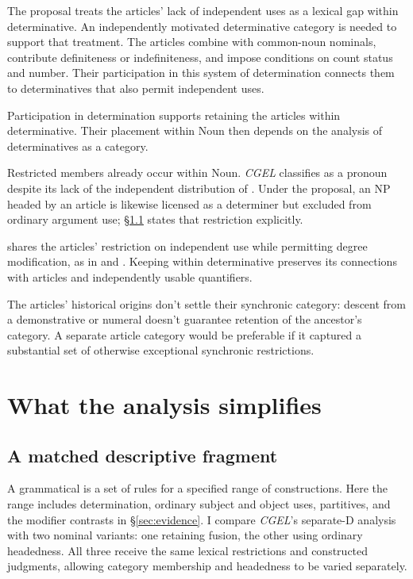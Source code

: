 \documentclass[12pt]{article}
\begin{document}
The proposal treats the articles' lack of independent uses as a lexical gap within determinative. An independently motivated determinative category is needed to support that treatment. The articles combine with common-noun nominals, contribute definiteness or indefiniteness, and impose conditions on count status and number. Their participation in this system of determination connects them to determinatives that also permit independent uses.

Participation in determination supports retaining the articles within determinative. Their placement within Noun then depends on the analysis of determinatives as a category.

Restricted members already occur within Noun. \textit{CGEL} classifies  as a pronoun despite its lack of the independent distribution of  \citep[470--471]{huddleston2002}. Under the proposal, an NP headed by an article is likewise licensed as a determiner but excluded from ordinary argument use; §\ref{sec:fragment} states that restriction explicitly.

 shares the articles' restriction on independent use while permitting degree modification, as in  and . Keeping  within determinative preserves its connections with articles and independently usable quantifiers.

The articles' historical origins don't settle their synchronic category: descent from a demonstrative or numeral doesn't guarantee retention of the ancestor's category. A separate article category would be preferable if it captured a substantial set of otherwise exceptional synchronic restrictions.

\section{What the analysis simplifies}\label{sec:economy}

\subsection{A matched descriptive fragment}\label{sec:fragment}

A grammatical  is a set of rules for a specified range of constructions. Here the range includes determination, ordinary subject and object uses, partitives, and the modifier contrasts in §\ref{sec:evidence}. I compare \textit{CGEL}'s separate-D analysis with two nominal variants: one retaining fusion, the other using ordinary headedness. All three receive the same lexical restrictions and constructed judgments, allowing category membership and headedness to be varied separately.
\end{document}
